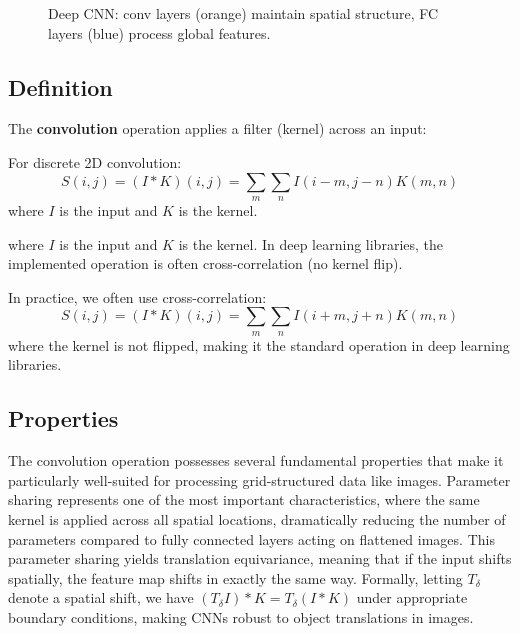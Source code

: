 \begin{figure}[h]
\caption{Deep CNN: conv layers (orange) maintain spatial structure, FC layers (blue) process global features.}
\label{fig:deep-cnn-architecture}
\end{figure}

\subsection{Definition}

The \textbf{convolution} operation applies a filter (kernel) across an input:

\begin{definition}
For discrete 2D convolution:
\begin{equation}
S(i,j) = (I * K)(i,j) = \sum_m \sum_n I(i-m, j-n) K(m, n)
\end{equation}
where $I$ is the input and $K$ is the kernel.
\end{definition}

where $I$ is the input and $K$ is the kernel. In deep learning libraries, the implemented operation is often cross-correlation (no kernel flip).

\begin{definition}
In practice, we often use cross-correlation:
\begin{equation}
S(i,j) = (I * K)(i,j) = \sum_m \sum_n I(i+m, j+n) K(m, n)
\end{equation}
where the kernel is not flipped, making it the standard operation in deep learning libraries.
\end{definition}

\subsection{Properties}

The convolution operation possesses several fundamental properties that make it particularly well-suited for processing grid-structured data like images. Parameter sharing represents one of the most important characteristics, where the same kernel is applied across all spatial locations, dramatically reducing the number of parameters compared to fully connected layers acting on flattened images. This parameter sharing yields translation equivariance, meaning that if the input shifts spatially, the feature map shifts in exactly the same way. Formally, letting \(T_\delta\) denote a spatial shift, we have \((T_\delta I) * K = T_\delta (I * K)\) under appropriate boundary conditions, making CNNs robust to object translations in images.

